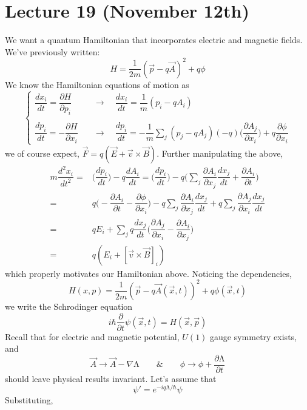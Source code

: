 \section{Lecture 19 (November 12th)}
\begin{recall}
We want a quantum Hamiltonian that incorporates electric and magnetic fields. We've previously written:
\[H=\dfrac{1}{2m}(\vec{p}-q\vec{A})^2+q\phi \]
We know the Hamiltonian equations of motion as
\[\begin{cases}
\dfrac{d x_{i}}{d t}=\dfrac{\partial H}{\partial p_{i}}\quad &\longrightarrow \quad\dfrac{d x_{i}}{d t}=\dfrac{1}{m}(p_{i}-qA_{i}) \\\\
\dfrac{d p_{i}}{d t}=-\dfrac{\partial H}{\partial x_{i}}\quad& \longrightarrow\quad \dfrac{d p_{i}}{d t}=-\dfrac{1}{m}\sum _{j}(p_{j}-qA_{j})(-q)\Big(\dfrac{\partial A_{j}}{\partial x_{i}} \Big)+q\dfrac{\partial \phi }{\partial x_{i}}
\end{cases}\]
we of course expect, $\vec{F}=q(\vec{E}+\vec{v}\times \vec{B})$. Further manipulating the above,
\[\begin{align*}
m\dfrac{d ^2x_{i}}{d t^2}=&\Big(\dfrac{d p_{i}}{d t} \Big)-q\dfrac{d A_{i}}{d t}=\Big(\dfrac{d p_{i}}{d t} \Big)-q\Big(\sum _{j}\dfrac{\partial A_{i}}{\partial x_{j}}\dfrac{d x_{j}}{d t}+\dfrac{\partial A_{i}}{\partial t}   \Big)\\
=&q\Big(-\dfrac{\partial A_{i}}{\partial t}-\dfrac{\partial \phi }{\partial x_{i}}\Big)-q\sum _{j}\dfrac{\partial A_{i}}{\partial x_{j}}\dfrac{d x_{j}}{d t}+q\sum _{j}\dfrac{\partial A_{j}}{\partial x_{i}}\dfrac{d x_{j}}{d t}\\=&qE_{i}+\sum _{j}q\dfrac{d x_{j}}{d t}\Big(\dfrac{\partial A_{j}}{\partial x_{i}}-\dfrac{\partial A_{i}}{\partial x_{j}}  \Big) \\
=&q(E_{i}+[\vec{v}\times \vec{B}]_{i})
\end{align*}\]
which properly motivates our Hamiltonian above. Noticing the dependencies,
\[H(x,p)=\dfrac{1}{2m}(\vec{p}-q\vec{A}(\vec{x},t))^2+q\phi (\vec{x},t)\]
we write the Schrodinger equation
\[i\hbar \dfrac{\partial }{\partial t}\psi (\vec{x},t)=H(\vec{x},\vec{p}) \]
Recall that for electric and magnetic potential, $U(1)$ gauge symmetry exists, and
\[\vec{A}\rightarrow \vec{A}-\nabla \mathrm{\Lambda }\qquad\&\qquad \phi \rightarrow \phi +\dfrac{\partial \mathrm{\Lambda }}{\partial t} \]
should leave physical results invariant. Let's assume that
\[\psi '=e^{-iq\mathrm{\Lambda }/\hbar }\psi \]
Substituting,
\[\begin{align*}

\end{align*}\]
\end{recall}
